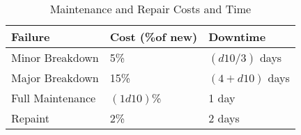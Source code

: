 \documentclass[a4paper,10pt]{article}
\begin{document}
\begin{table}
\begin{center}
  \caption{Maintenance and Repair Costs and Time}
  \begin{tabular}{lll}
    \toprule
    Failure          & Cost (\%of new) & Downtime  \\
    \midrule
    Minor Breakdown  & 5\%             & $(d10 / 3)$ days\\
    Major Breakdown  & 15\%            & $(4 + d10)$ days \\
    Full Maintenance & $(1d10)$\%      & 1 day\\
    Repaint          & 2\%             & 2 days\\
    \bottomrule
  \end{tabular}
\end{center}
\end{table}
\end{document}
